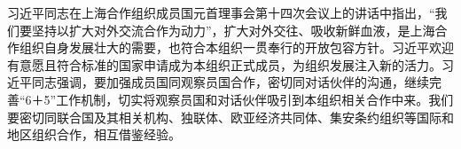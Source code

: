 \documentclass[12pt,titlepage]{ctexart}
\begin{document}
    习近平同志在上海合作组织成员国元首理事会第十四次会议上的讲话中指出，``我们要坚持以扩大对外交流合作为动力''，扩大对外交往、吸收新鲜血液，是上海合作组织自身发展壮大的需要，也符合本组织一贯奉行的开放包容方针。习近平欢迎有意愿且符合标准的国家申请成为本组织正式成员，为组织发展注入新的活力。习近平同志强调，要加强成员国同观察员国合作，密切同对话伙伴的沟通，继续完善“6＋5”工作机制，切实将观察员国和对话伙伴吸引到本组织相关合作中来。我们要密切同联合国及其相关机构、独联体、欧亚经济共同体、集安条约组织等国际和地区组织合作，相互借鉴经验\cite{xi-2014}。

    \nocite{*}
    
\end{document}
